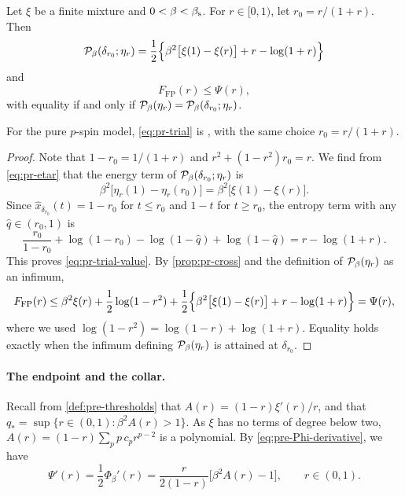 \begin{lemma}\label{lem:pr-trial}
Let $\xi$ be a finite mixture and $0<\beta<\beta_{\mathrm s}$. For $r\in[0,1)$, let $r_0=r/(1+r)$. Then
\begin{equation}\label{eq:pr-trial-value}
\mathcal P_\beta(\delta_{r_0};\eta_r)=\frac12\Bigl\{\beta^2\bigl[\xi(1)-\xi(r)\bigr]+r-\log(1+r)\Bigr\}
\end{equation}
and
\begin{equation}\label{eq:pr-trial}
F_{\mathrm{FP}}(r)\le\Psi(r),
\end{equation}
with equality if and only if $\mathcal P_\beta(\eta_r)=\mathcal P_\beta(\delta_{r_0};\eta_r)$.
\end{lemma}

For the pure $p$-spin model, \eqref{eq:pr-trial} is \cite[Proposition~3.9]{ElAlaouiMontanariSellke2025}, with the same choice $r_0=r/(1+r)$.

\begin{proof}
Note that $1-r_0=1/(1+r)$ and $r^2+(1-r^2)r_0=r$. We find from \eqref{eq:pr-etar} that the energy term of $\mathcal P_\beta(\delta_{r_0};\eta_r)$ is
\[
\beta^2\bigl[\eta_r(1)-\eta_r(r_0)\bigr]=\beta^2\bigl[\xi(1)-\xi(r)\bigr].
\]
Since $\hat x_{\delta_{r_0}}(t)=1-r_0$ for $t\le r_0$ and $1-t$ for $t\ge r_0$, the entropy term with any $\hat q\in(r_0,1)$ is
\[
\frac{r_0}{1-r_0}+\log(1-r_0)-\log(1-\hat q)+\log(1-\hat q)=r-\log(1+r).
\]
This proves \eqref{eq:pr-trial-value}. By \cref{prop:pr-cross} and the definition of $\mathcal P_\beta(\eta_r)$ as an infimum,
\[
F_{\mathrm{FP}}(r)\le\beta^2\xi(r)+\frac12\log(1-r^2)+\frac12\Bigl\{\beta^2\bigl[\xi(1)-\xi(r)\bigr]+r-\log(1+r)\Bigr\}=\Psi(r),
\]
where we used $\log(1-r^2)=\log(1-r)+\log(1+r)$. Equality holds exactly when the infimum defining $\mathcal P_\beta(\eta_r)$ is attained at $\delta_{r_0}$.
\end{proof}

\paragraph{The endpoint and the collar.}
Recall from \cref{def:pre-thresholds} that $A(r)=(1-r)\xi'(r)/r$, and that $q_*=\sup\{r\in(0,1)\colon\beta^2A(r)>1\}$. As $\xi$ has no terms of degree below two, $A(r)=(1-r)\sum_pp\,c_pr^{p-2}$ is a polynomial. By \eqref{eq:pre-Phi-derivative}, we have
\begin{equation}\label{eq:pr-Psi-prime}
\Psi'(r)=\frac12\Phi_\beta'(r)=\frac{r}{2(1-r)}\bigl[\beta^2A(r)-1\bigr],\qquad r\in(0,1).
\end{equation}

